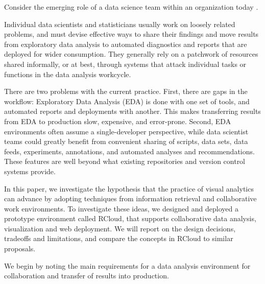 

\maketitle


Consider the emerging role of a data science team within an
organization today \cite{Keim:2008:VAS}.

Individual data scientists and statisticians usually work on loosely
related problems, and must devise effective ways to share their findings
and move results from exploratory data analysis to automated diagnostics
and reports that are deployed for wider consumption.
They generally rely on a patchwork of resources shared informally,
or at best, through systems that attack individual tasks or functions
in the data analysis workcycle.

There are two problems with the current
practice. First, there are gaps in the workflow:
Exploratory Data Analysis (EDA) is done with one set of tools,
and automated reports and deployments with another. This makes
transferring results from EDA to production slow, expensive, and error-prone.
Second, EDA environments often assume a single-developer perspective,
while data scientist teams could greatly benefit from convenient sharing of
scripts, data sets, data feeds, experiments, annotations, and automated
analyses and recommendations. These features are well beyond what existing
repositories and version control systems provide.

 In this paper, we investigate the hypothesis
that the practice of visual analytics can advance by adopting techniques
from information retrieval and collaborative work environments. To investigate
these ideas, we designed and deployed a prototype environment called RCloud,
that supports collaborative data analysis, visualization and web deployment.
We will report on the design decisions, tradeoffs and limitations, and compare
the concepts in RCloud to similar proposals.


We begin by noting the main requirements for a data analysis environment for
collaboration and transfer of results into production.

